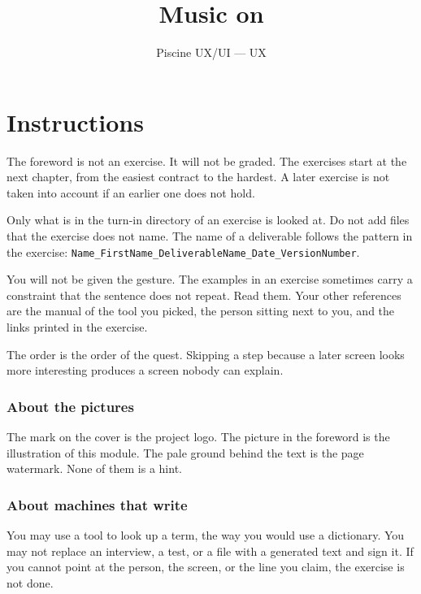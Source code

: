 \documentclass{training}
\begin{document}
\title{Music on}
\subtitle{Piscine UX/UI --- UX}
\maketitle

\newpage
\tableofcontents
\newpage


\chapter{Instructions}

The foreword is not an exercise. It will not be graded. The exercises start at the next chapter, from the easiest contract to the hardest. A later exercise is not taken into account if an earlier one does not hold.

Only what is in the turn-in directory of an exercise is looked at. Do not add files that the exercise does not name. The name of a deliverable follows the pattern in the exercise: \texttt{Name\_FirstName\_DeliverableName\_Date\_VersionNumber}.

You will not be given the gesture. The examples in an exercise sometimes carry a constraint that the sentence does not repeat. Read them. Your other references are the manual of the tool you picked, the person sitting next to you, and the links printed in the exercise.

The order is the order of the quest. Skipping a step because a later screen looks more interesting produces a screen nobody can explain.

\subsection*{About the pictures}

The mark on the cover is the project logo. The picture in the foreword is the illustration of this module. The pale ground behind the text is the page watermark. None of them is a hint.

\subsection*{About machines that write}

You may use a tool to look up a term, the way you would use a dictionary. You may not replace an interview, a test, or a file with a generated text and sign it. If you cannot point at the person, the screen, or the line you claim, the exercise is not done.
\end{document}
